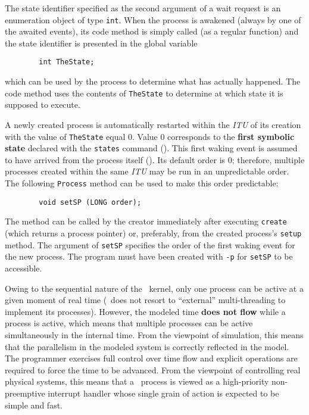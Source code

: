 The state identifier specified as the second argument of a wait
request is an enumeration object of type {\tt int}.
When the process is awakened (always by one of the awaited events), its
code method is simply called (as a regular function) and the
state identifier is presented in the global variable
\begin{verbatim}
        int TheState;
\end{verbatim}
which can be used by the process to determine what has actually happened.
The code method uses the contents of {\tt TheState} to determine at which
state it is supposed to execute.

A newly created process is automatically restarted within the {\em ITU\/}
of its creation with the value of {\tt TheState} equal 0.
Value 0 corresponds to the {\bf first symbolic state} declared with the
{\tt states} command ().
This first waking event is assumed to have arrived from the process itself
().
Its default order is 0; therefore,
multiple processes created within the same {\em ITU\/} may be
run in an unpredictable order.
The following {\tt Process} method can be used to make this order
predictable:
\begin{verbatim}
        void setSP (LONG order);
\end{verbatim}
The method can be called by the creator immediately after executing
{\tt create} (which returns a process pointer) or, preferably, from
the created process's {\tt setup} method.
The argument of {\tt setSP} specifies the order of the first waking event
for the new process.
The program must have been created with 
{\tt -p} for {\tt setSP} to be accessible.

Owing to the sequential nature of the \smurph\ kernel, only one process
can be active at a given moment of real time (\smurph\ does not resort
to ``external'' multi-threading to implement its processes).
However, the modeled time {\bf does not flow} while a process is active,
which means that multiple
processes can be active simultaneously in the internal time.
From the viewpoint of simulation, this means that the parallelism in the
modeled system is correctly reflected in the model.
The programmer exercises full control over time flow and
explicit operations are required to force the time to be advanced.
From the viewpoint of controlling real physical systems, this means that
a \smurph\ process is viewed as a high-priority non-preemptive
interrupt handler whose single grain of action is expected to be simple and
fast.

